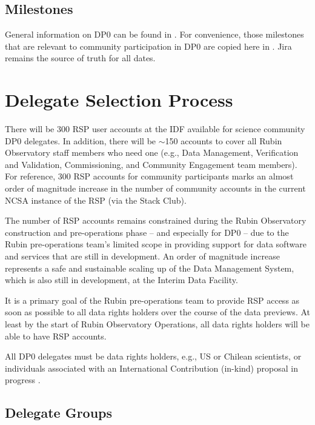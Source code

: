 \documentclass[DM,lsstdraft,authoryear,toc]{lsstdoc}
\begin{document}
\subsection{Milestones}
General  information on DP0 can be found in .
For convenience, those milestones  that are relevant to community participation in DP0 are copied here in . 
Jira remains the source of truth for all dates. 


\section{Delegate Selection Process}\label{sec:sel}

There will be 300 RSP user accounts at the IDF available for science community DP0 delegates.
In addition, there will be $\sim$150 accounts to cover all Rubin Observatory staff members who need one (e.g., Data Management, Verification and Validation, Commissioning, and Community Engagement team members).
For reference, 300 RSP accounts for community participants marks an almost order of magnitude increase in the number of community accounts in the current NCSA instance of the RSP (via the Stack Club).

The number of RSP accounts remains constrained during the Rubin Observatory construction and pre-operations phase -- and especially for DP0 -- due to the Rubin pre-operations team's limited scope in providing support for data software and services that are still in development.
An order of magnitude increase represents a safe and sustainable scaling up of the Data Management System, which is also still in development, at the Interim Data Facility.

It is a primary goal of the Rubin pre-operations team to provide RSP access as soon as possible to all data rights holders over the course of the data previews. 
At least by the start of Rubin Observatory Operations, all data rights holders will be able to have RSP accounts.

All DP0 delegates must be data rights holders, e.g., US or Chilean scientists, or individuals associated with an International Contribution (in-kind) proposal in progress .

\subsection{Delegate Groups}\label{ssec:sel_grps}
\end{document}
